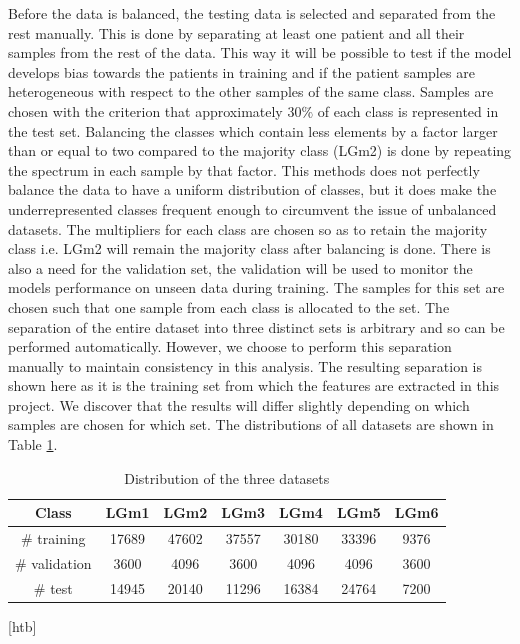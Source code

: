 Before the data is balanced, the testing data is selected and separated from the rest manually. This is done by separating at least one patient and all their samples from the rest of the data. This way it will be possible to test if the model develops bias towards the patients in training and if the patient samples are heterogeneous with respect to the other samples of the same class. Samples are chosen with the criterion that approximately $30\%$ of each class is represented in the test set. Balancing the classes which contain less elements by a factor larger than or equal to two compared to the majority class (LGm2) is done by repeating the spectrum in each sample by that factor. This methods does not perfectly balance the data to have a uniform distribution of classes, but it does make the underrepresented classes frequent enough to circumvent the issue of unbalanced datasets. The multipliers for each class are chosen so as to retain the majority class i.e. LGm2 will remain the majority class after balancing is done. There is also a need for the validation set, the validation will be used to monitor the models performance on unseen data during training. The samples for this set are chosen such that one sample from each class is allocated to the set. The separation of the entire dataset into three distinct sets is arbitrary and so can be performed automatically. However, we choose to perform this separation manually to maintain consistency in this analysis. The resulting separation is shown here as it is the training set from which the features are extracted in this project. We discover that the results will differ slightly depending on which samples are chosen for which set. The distributions of all datasets are shown in Table \ref{table:2}.

\begin{table}[H]
\centering
 \begin{tabular}{||c c c c c c c||} 
 \hline
 Class & LGm1 & LGm2 & LGm3 & LGm4 & LGm5 & LGm6 \\ [0.5ex] 
 \hline\hline
 \# training & 17689 & 47602 & 37557 & 30180 & 33396 & 9376 \\
 \hline 
 \# validation & 3600 & 4096 & 3600 & 4096 & 4096 & 3600 \\
 \hline
 \# test & 14945 & 20140 & 11296 & 16384 & 24764 & 7200 \\
 \hline

\end{tabular}[htb]
\caption{Distribution of the three datasets}
\label{table:2}
\end{table}

